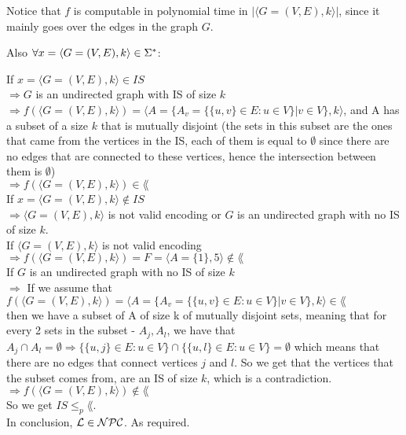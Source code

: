 Notice that $f$ is computable in polynomial time in $|\langle G=(V,E), k \rangle|$, since it mainly goes over the edges in the graph $G$.

Also $\forall x = \langle G=(V,E), k \rangle \in \Sigma^*$:

If $x = \langle G=(V,E), k \rangle \in IS$ \\
$\Rightarrow G$ is an undirected graph with IS of size $k$ \\
$\Rightarrow f(\langle G=(V,E), k \rangle) = \langle A=\{A_v = \{\{u,v\} \in E: u \in V\} | v \in V\}, k \rangle$, and A has a subset
of a size $k$ that is mutually disjoint (the sets in this subset are the ones that came from the vertices in the IS,
each of them is equal to $\emptyset$ since there are no edges that are connected to these vertices, hence the intersection between them is $\emptyset$) \\
$\Rightarrow f(\langle G=(V,E), k \rangle) \in \lang$ \\

If $x = \langle G=(V,E), k \rangle \notin IS$ \\
$\Rightarrow \langle G=(V,E), k \rangle$ is not valid encoding or $G$ is an undirected graph with no IS of size $k$. \\
If $\langle G=(V,E), k \rangle$ is not valid encoding \\
$\Rightarrow f(\langle G=(V,E), k \rangle) = F = \langle A=\{1\}, 5 \rangle \notin \lang$ \\
If $G$ is an undirected graph with no IS of size $k$ \\
$\Rightarrow $ If we assume that $f(\langle G=(V,E), k \rangle) = \langle A=\{A_v = \{\{u,v\} \in E: u \in V\} | v \in V\}, k \rangle \in \lang$ \\
then we have a subset of A of size k of mutually disjoint sets, meaning that for every 2 sets in the subset - $A_j, A_l$,
we have that $A_j \cap A_l = \emptyset \Rightarrow \{\{u,j\} \in E: u \in V\} \cap \{\{u,l\} \in E: u \in V\} = \emptyset$
which means that there are no edges that connect vertices $j$ and $l$. So we get that the vertices that the subset comes from, are an
IS of size $k$, which is a contradiction. \\
$\Rightarrow f(\langle G=(V,E), k \rangle) \notin \lang$ \\

So we get \underline{$IS \leq_p \lang$}. \\
In conclusion, $\mathcal{L} \in \mathcal{N}\mathcal{P}\mathcal{C}$. As required.
